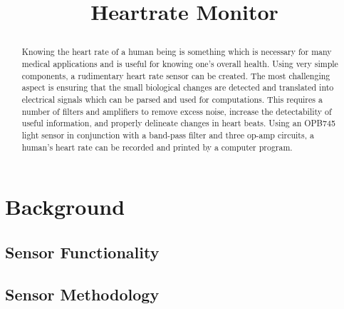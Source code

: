\documentclass[conference]{IEEEtran}
\begin{document}
\title{Heartrate Monitor\\

\author{
\and
{}
}
}

\maketitle

\begin{abstract}
Knowing the heart rate of a human being is something which is necessary for many medical applications and is useful for knowing one's overall health. Using very simple components, a rudimentary heart rate sensor can be created. The most challenging aspect is ensuring that the small biological changes are detected and translated into electrical signals which can be parsed and used for computations. This requires a number of filters and amplifiers to remove excess noise, increase the detectability of useful information, and properly delineate changes in heart beats. Using an OPB745 light sensor in conjunction with a band-pass filter and three op-amp circuits, a human's heart rate can be recorded and printed by a computer program.
\end{abstract}

\section{Background}
    \subsection{Sensor Functionality}
    \subsection{Sensor Methodology}
\end{document}
